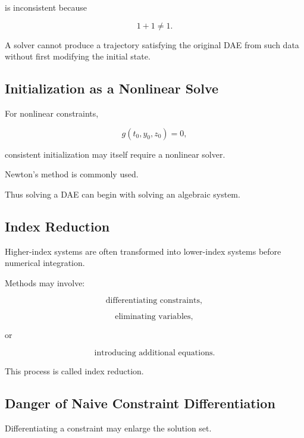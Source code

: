 is inconsistent because

\[
1+1\neq1.
\]

A solver cannot produce a trajectory satisfying the original DAE from
such data without first modifying the initial state.

\subsection{Initialization as a Nonlinear Solve}
\label{subsec:dae-initialization-nonlinear-solve}

For nonlinear constraints,

\[
g(t_0,y_0,z_0)=0,
\]

consistent initialization may itself require a nonlinear solver.

Newton's method is commonly used.

Thus solving a DAE can begin with solving an algebraic system.

\subsection{Index Reduction}
\label{subsec:dae-index-reduction}

Higher-index systems are often transformed into lower-index systems before
numerical integration.

Methods may involve:

\[
\boxed{
\text{differentiating constraints},
}
\]

\[
\boxed{
\text{eliminating variables},
}
\]

or

\[
\boxed{
\text{introducing additional equations}.
}
\]

This process is called index reduction.

\subsection{Danger of Naive Constraint Differentiation}
\label{subsec:danger-naive-index-reduction}

Differentiating a constraint may enlarge the solution set.

